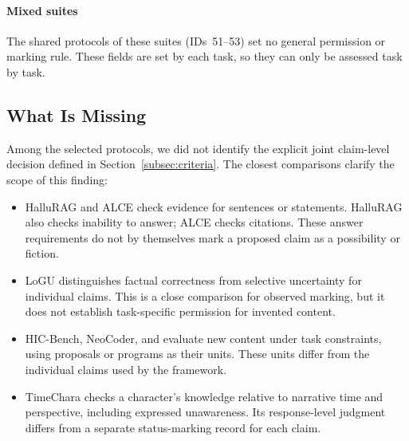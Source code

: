 \documentclass{clv2025}
\begin{document}
\paragraph{Mixed suites}
The shared protocols of these suites (IDs~51--53) set no general permission or marking
rule. These fields are set by each task, so they can only be assessed task
by task.

\subsection{What Is Missing}\label{subsec:gap}

Among the selected protocols, we did not identify the explicit joint
claim-level decision defined in Section~\ref{subsec:criteria}. The closest
comparisons clarify the scope of this finding:
\begin{itemize}
\item HalluRAG and ALCE check evidence for sentences or statements.
HalluRAG also checks inability to answer; ALCE checks citations. These
answer requirements do not by themselves mark a proposed claim as a
possibility or fiction.
\item LoGU distinguishes factual correctness from selective uncertainty
for individual claims. This is a close comparison for observed marking,
but it does not establish task-specific permission for invented content.
\item HIC-Bench, NeoCoder, and \citet{si_ideas_2025} evaluate new content
under task constraints, using proposals or programs as their units.
These units differ from the individual claims used by the framework.
\item TimeChara checks a character's knowledge relative to narrative time
and perspective, including expressed unawareness. Its response-level
judgment differs from a separate status-marking record for each claim.
\end{itemize}
\end{document}
